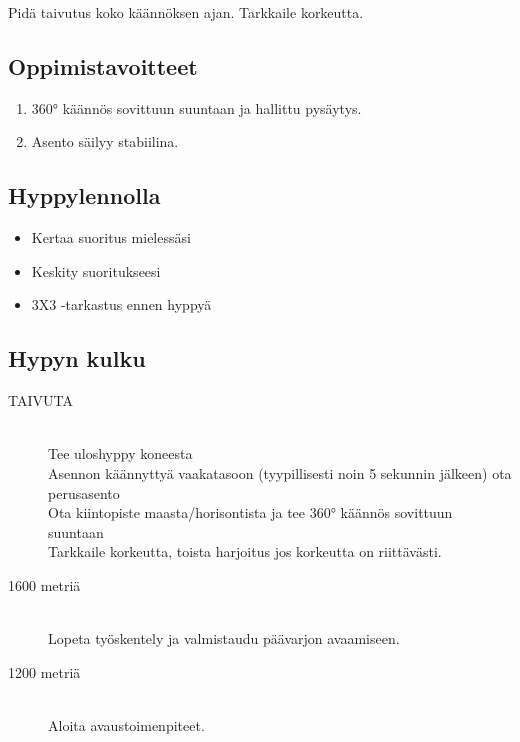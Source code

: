 \begin{multicols}{2}
Pidä taivutus koko käännöksen ajan. Tarkkaile korkeutta. 

\subsection{ Oppimistavoitteet }
\label{pl-peruskoulutuksen-suoritukset-oppimistavoitteet}

\begin{enumerate}[label=\bfseries \arabic*)]
\item  360° käännös sovittuun suuntaan ja hallittu pysäytys. 
\item  Asento säilyy stabiilina. 
\end{enumerate}
\subsection{ Hyppylennolla }
\label{pl-peruskoulutuksen-suoritukset-hyppylennolla}

\begin{itemize}
\item Kertaa suoritus mielessäsi 
\item Keskity suoritukseesi 
\item 3X3 -tarkastus ennen hyppyä 
\end{itemize}
\subsection{ Hypyn kulku }
\label{pl-peruskoulutuksen-suoritukset-hypyn-kulku}

\begin{description}
\item[TAIVUTA] \hfill \\ 
Tee uloshyppy koneesta \hfill \\ 
Asennon käännyttyä vaakatasoon (tyypillisesti noin 5 sekunnin jälkeen) ota perusasento \hfill \\ 
Ota kiintopiste maasta/horisontista ja tee 360° käännös sovittuun suuntaan \hfill \\ 
Tarkkaile korkeutta, toista harjoitus jos korkeutta on riittävästi. \hfill \\ 
\item[1600 metriä] \hfill \\ 
Lopeta työskentely ja valmistaudu päävarjon avaamiseen. \hfill \\ 
\item[1200 metriä] \hfill \\ 
Aloita avaustoimenpiteet. \hfill \\ 
\end{description}


\end{multicols}
